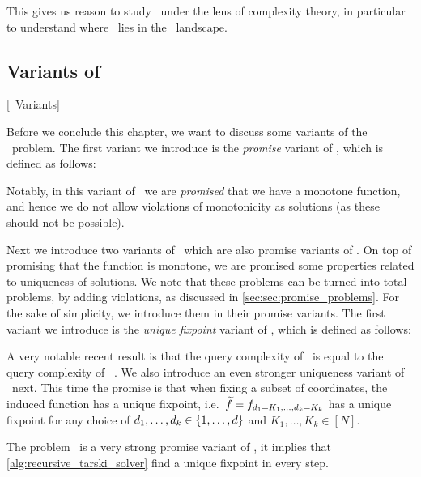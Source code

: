 This gives us reason to study \Tarski\ under the lens of complexity theory, in particular to understand where \Tarski\ lies in the \TFNP\ landscape.

\subsection{Variants of \Tarski}[\Tarski\ Variants]

Before we conclude this chapter, we want to discuss some variants of the \Tarski\ problem. The first variant we introduce is the \emph{promise} variant of \Tarski, which is defined as follows:


Notably, in this variant of \Tarski\ we are \emph{promised} that we have a monotone function, and hence we do not allow violations of monotonicity as solutions (as these should not be possible).

Next we introduce two variants of \Tarski\ which are also promise variants of \Tarski. On top of promising that the function is monotone, we are promised some properties related to uniqueness of solutions. We note that these problems can be turned into total problems, by adding violations, as discussed in \cref{sec:sec:promise_problems}. For the sake of simplicity, we introduce them in their promise variants. The first variant we introduce is the \emph{unique fixpoint} variant of \Tarski, which is defined as follows:


A very notable recent result is that the query complexity of \SuperUniqueTarski\, \UniqueTarski is equal to the query complexity of \Tarski\ .  We also introduce an even stronger uniqueness variant of \Tarski\ next. This time the promise is that when fixing a subset of coordinates, the induced function has a unique fixpoint, i.e.\ $\widetilde{f} = f_{d_1=K_1, \dots, d_k=K_k}$ has a unique fixpoint for any choice of $d_1, \dots, d_k \in \left\{1, \dots, d\right\}$ and $K_1, \dots, K_k \in [N]$.


The problem \SuperUniqueTarski\ is a very strong promise variant of \Tarski, it implies that \cref{alg:recursive_tarski_solver} find a unique fixpoint in every step.